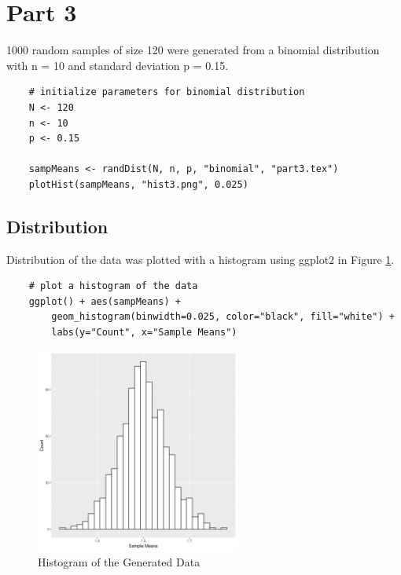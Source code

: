 \documentclass{article}
\begin{document}
    \clearpage

    \section{Part 3}
        1000 random samples of size 120 were generated from a binomial distribution with n = 10 and standard deviation p = 0.15.

\begin{lstlisting}
    # initialize parameters for binomial distribution
    N <- 120
    n <- 10
    p <- 0.15

    sampMeans <- randDist(N, n, p, "binomial", "part3.tex")
    plotHist(sampMeans, "hist3.png", 0.025)
\end{lstlisting}

        

        \subsection{Distribution}
            Distribution of the data was plotted with a histogram using ggplot2 in Figure \ref{fig:hist3}.
\begin{lstlisting}
    # plot a histogram of the data
    ggplot() + aes(sampMeans) + 
        geom_histogram(binwidth=0.025, color="black", fill="white") +
        labs(y="Count", x="Sample Means")
\end{lstlisting}

            \begin{figure}[h!]
                \begin{center}
                    \includegraphics[width=0.6\textwidth]{figures/hist3.png}
                    \caption{Histogram of the Generated Data} \label{fig:hist3}
                \end{center}
            \end{figure}
\end{document}
